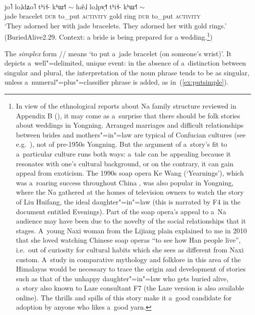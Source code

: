\begin{exe}
	\ex
	\label{ex:costume}
	\\
	\gll jo˥	lo˩dʑo˥		tʰi˧-		kʰɯ˧˥	{$\sim$}		hæ̃˩	lo˩pv̩˧˥ 	tʰi˧-		kʰɯ˧˥	{$\sim$}\\
	jade	bracelet	\textsc{dur}	to\_put		\textsc{activity}	gold		ring		\textsc{dur}	to\_put		\textsc{activity}\\
	\glt ‘They adorned her with jade bracelets. They adorned her with gold rings.’ (BuriedAlive2.29. Context: a bride is being prepared for a wedding.\footnote{In view of the ethnological reports about Na family structure reviewed in Appendix B (), it may come as a~surprise that there should be folk stories about weddings in Yongning. Arranged marriages and difficult relationships between brides and mothers"=in"=law are typical of Confucian cultures (see e.g.~\citealt{rileyInterwoven1994, chanviolence2008}), not of pre-1950s Yongning. But the argument of a~story's fit to a~particular culture runs both ways: a~tale can be appealing because it resonates with one's cultural background, or on the contrary, it can gain appeal from exoticism. The 1990s soap opera Ke Wang  (‘Yearnings’), which was a~roaring success throughout China \citep[a~phenomenon studied by][]{wangkewang1992}, was also popular in Yongning, where the Na gathered at the homes of television owners to watch the story of Liu Huifang, the ideal daughter"=in"=law (this is narrated by F4 in the document entitled Evenings). Part of the soap opera's appeal to a~Na audience may have been due to the novelty of the social relationships that it stages. A~young {Naxi} woman from the Lijiang plain explained to me in 2010 that she loved watching Chinese soap operas “to see how Han people live”, i.e.\ out of curiosity for cultural habits which she sees as different from {Naxi} custom. A~study in comparative mythology and folklore in this area of the Himalayas would be necessary to trace the origin and development of stories such as that of the unhappy daughter"=in"=law who gets buried alive, a~story also known to {Laze} consultant F7 (the {Laze} version is also available online). The thrills and spills of this story make it a~good candidate for adoption by anyone who likes a~good yarn.})
\end{exe}

The \textit{simplex} form // means ‘to put a~jade bracelet (on someone's wrist)’. It depicts a~well"=delimited, unique event: in the absence of a~distinction between singular and plural, the interpretation of the noun phrase tends to be as singular, unless a~numeral"=plus"=classifier phrase is added, as in~(\ref{ex:putsimple}).  

